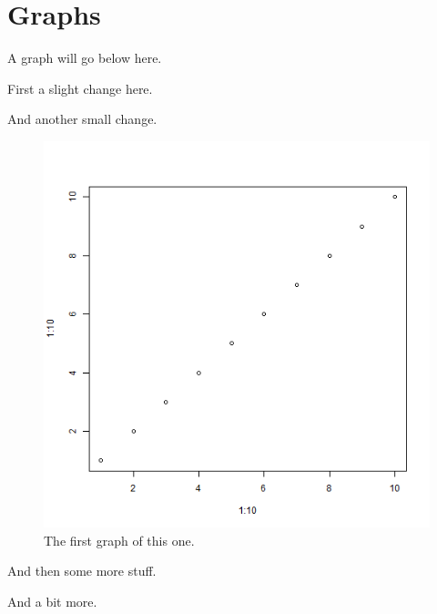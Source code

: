 \section{Graphs}
\label{sec:Graph}
A graph will go below here.

First a slight change here.

And another small change.

\begin{knitrout}
\color{fgcolor}\begin{kframe}
\begin{flushleft}
\ttfamily\noindent
{}\hlkeyword{(}\hlkeyword{:}\hlkeyword{,}{\ }\hlkeyword{:}\hlkeyword{)}\mbox{}
\normalfont
\end{flushleft}
\end{kframe}\begin{figure}[!hbtp]


{\centering \includegraphics[width=.45\linewidth]{chunk2/figure/first-plot} 

}

\caption[First Graph]{The first graph of this one.\label{fig:first-plot}}
\end{figure}

\end{knitrout}


And then some more stuff.

And a bit more.
